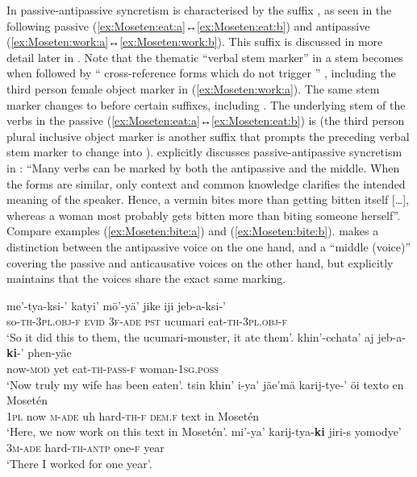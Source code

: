 In  passive-antipassive syncretism is characterised by the suffix , as seen in the following passive  (\ref{ex:Moseten:eat:a}↔\ref{ex:Moseten:eat:b}) and antipassive  (\ref{ex:Moseten:work:a}↔\ref{ex:Moseten:work:b}). This suffix is discussed in more detail later in . Note that the thematic “verbal stem marker”  in a stem becomes  when followed by “ cross-reference forms which do not trigger ” \citep[45]{sakel:2004}, including the third person female object marker  in (\ref{ex:Moseten:work:a}). The same stem marker changes to  before certain suffixes, including  \citep[47, 308]{sakel:2004}. The underlying stem of the verbs in the passive  (\ref{ex:Moseten:eat:a}↔\ref{ex:Moseten:eat:b}) is  (the third person plural inclusive object marker  is another suffix that prompts the preceding verbal stem marker  to change into ). \citet[308]{sakel:2004} explicitly discusses passive-antipassive syncretism in : “Many verbs can be marked by both the antipassive and the middle. When the forms are similar, only context and common knowledge clarifies the intended meaning of the speaker. Hence, a vermin bites more than getting bitten itself […], whereas a woman most probably gets bitten more than biting someone herself”. Compare examples (\ref{ex:Moseten:bite:a}) and (\ref{ex:Moseten:bite:b}). \citet[306ff.]{sakel:2004} makes a distinction between the antipassive voice on the one hand, and a “middle (voice)” covering the passive and anticausative voices on the other hand, but explicitly maintains that the voices share the exact same marking.

\ea {} \citep[231, 306, 311]{sakel:2004}
\ea\label{ex:Moseten:eat:a}
	\gll	me’-tya-ksi-’ katyi’ mö’-yä’ jike iji jeb-a-ksi-’ \\
			so-\textsc{th-3pl.obj-f} \textsc{evid} \textsc{3f-ade} \textsc{pst} ucumari eat-\textsc{th-3pl.obj-f} \\
	\glt	‘So it did this to them, the ucumari-monster, it ate them’.
\ex\label{ex:Moseten:eat:b}
	\gll	khin’-cchata’ aj jeb-a-\textbf{ki}-’ phen-yäe \\
			now-\textsc{mod} yet eat-\textsc{th-pass-f} woman-\textsc{1sg.poss} \\
	\glt	‘Now truly my wife has been eaten’.
\ex\label{ex:Moseten:work:a}
	\gll	tsin khin’ i-ya’ jäe’mä karij-tye-’ öi texto en Mosetén \\
			\textsc{1pl} now \textsc{m-ade} uh hard-\textsc{th-f} \textsc{dem.f} text in Mosetén \\
	\glt	‘Here, we now work on this text in Mosetén’.
\ex\label{ex:Moseten:work:b}
	\gll	mi’-ya’ karij-tya-\textbf{ki} jiri-s yomodye’ \\
			\textsc{3m-ade} hard-\textsc{th-antp} one-\textsc{f} year \\
	\glt	‘There I worked for one year’.
	\z 
\z

